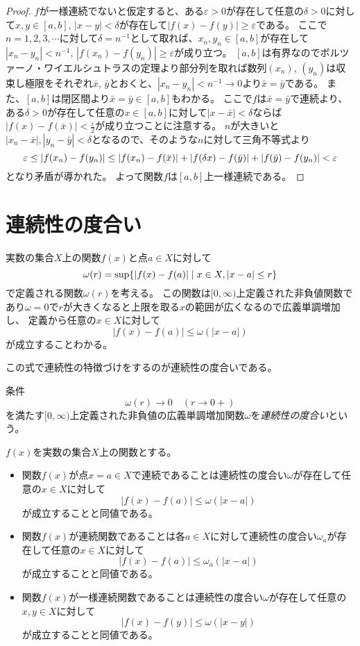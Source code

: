 \begin{proof}
$f$が一様連続でないと仮定すると、ある$\varepsilon > 0$が存在して任意の$\delta > 0$に対して$x, y \in [a, b]$, $|x-y| < \delta$が存在して$|f(x)-f(y)| \ge \varepsilon$である。
ここで$n = 1, 2, 3, \cdots$に対して$\delta = n^{-1}$として取れば、$x_n, y_n \in [a, b]$が存在して$|x_n-y_n| < n^{-1}$, $|f(x_n)-f(y_n)| \ge \varepsilon$が成り立つ。
$[a, b]$は有界なのでボルツァーノ・ワイエルシュトラスの定理より部分列を取れば数列$(x_n)$, $(y_n)$は収束し極限をそれぞれ$\bar{x}$, $\bar{y}$とおくと、$|x_n-y_n| < n^{-1} \to 0$より$\bar{x} = \bar{y}$である。
また、$[a, b]$は閉区間より$\bar{x} = \bar{y} \in [a, b]$もわかる。
ここで$f$は$\bar{x} = \bar{y}$で連続より、ある$\delta > 0$が存在して任意の$x \in [a, b]$に対して$|x-\bar{x}| < \delta$ならば$|f(x)-f(\bar{x})| < \frac{\varepsilon}{2}$が成り立つことに注意する。
$n$が大きいと$|x_n-\bar{x}|, |y_n-\bar{y}| < \delta$となるので、そのような$n$に対して三角不等式より
$$
\varepsilon \le |f(x_n)-f(y_n)| \le |f(x_n)-f(\bar{x})|+|f(\var{x})-f(\bar{y})|+|f(\bar{y})-f(y_n)| < \varepsilon
$$
となり矛盾が導かれた。
よって関数$f$は$[a, b]$上一様連続である。
\end{proof}

\section{連続性の度合い}

実数の集合$X$上の関数$f(x)$と点$a \in X$に対して
$$
\omega(r) = \sup\{ |f(x)-f(a)| \mid x \in X, |x-a| \le r \}
$$
で定義される関数$\omega(r)$を考える。
この関数は$[0, \infty)$上定義された非負値関数であり$\omega = 0$で$r$が大きくなると上限を取る$x$の範囲が広くなるので広義単調増加し、
定義から任意の$x \in X$に対して
$$
|f(x)-f(a)| \le \omega(|x-a|)
$$
が成立することわかる。

この式で連続性の特徴づけをするのが連続性の度合いである。

\begin{definition}[連続性の度合い]
条件
$$
\omega(r) \to 0 \quad (r \to 0+)
$$
を満たす$[0, \infty)$上定義された非負値の広義単調増加関数$\omega$を\emph{連続性の度合い}という。
\end{definition}

\begin{proposition}
$f(x)$を実数の集合$X$上の関数とする。
\begin{itemize}
\item
関数$f(x)$が点$x = a \in X$で連続であることは連続性の度合い$\omega$が存在して任意の$x \in X$に対して
$$
|f(x)-f(a)| \le \omega(|x-a|)
$$
が成立することと同値である。
\item
関数$f(x)$が連続関数であることは各$a \in X$に対して連続性の度合い$\omega_a$が存在して任意の$x \in X$に対して
$$
|f(x)-f(a)| \le \omega_a(|x-a|)
$$
が成立することと同値である。
\item
関数$f(x)$が一様連続関数であることは連続性の度合い$\omega$が存在して任意の$x, y \in X$に対して
$$
|f(x)-f(y)| \le \omega(|x-y|)
$$
が成立することと同値である。
\end{itemize}
\end{proposition}
